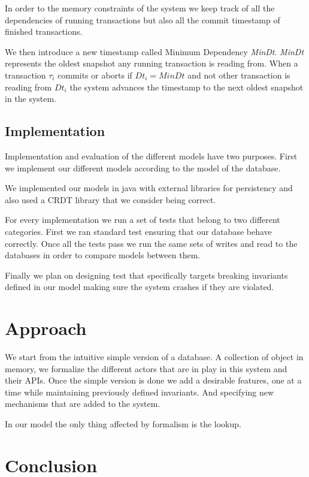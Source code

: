 \documentclass[parallelisme]{compas2022}
\begin{document}
In order to the memory constraints of the system we keep track of all the dependencies of running transactions but also all the commit timestamp of finished transactions.

We then introduce a new timestamp called Minimum Dependency \emph{MinDt}.
\emph{MinDt} represents the oldest snapshot any running transaction is reading from.
When a transaction $\tau_i$ commits or aborts if $Dt_i = MinDt$ and not other transaction is reading from $Dt_i$ the system advances the timestamp to the next oldest snapshot in the system.


\subsection{Implementation}

Implementation and evaluation of the different models have two purposes.
First we implement our different models according to the model of the database.

We implemented our models in java with external libraries for persistency and also used a CRDT library that we consider being correct.

For every implementation we run a set of tests that belong to two different categories.
First we ran standard test ensuring that our database behave correctly.
Once all the tests pass we run the same sets of writes and read to the databases in order to compare models between them.

Finally we plan on designing test that specifically targets breaking invariants defined in our model making sure the system crashes if they are violated.



\section{Approach}

We start from the intuitive simple version of a database.
A collection of object in memory, we formalize the different actors that are in play in this system and their APIs.
Once the simple version is done we add a desirable features, one at a time while maintaining previously defined invariants.
And specifying new mechanisms that are added to the system.



In our model the only thing affected by formalism is the lookup.

\section{Conclusion}



\end{document}
